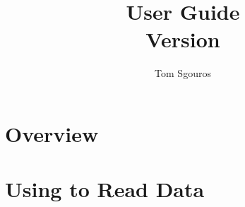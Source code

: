 \documentclass{dods-book}
\newcommand{\DOCversion}{Version \rcsInfoRevision}
\begin{document}
\title{\opendap User Guide\\\DOCversion}
\author{Tom Sgouros}
\date{\rcsInfoDate}
\maketitle

\copyrightmatter

\W{}



\tableofcontents
\listoffigures
\listoftables

\clearemptydoublepage


\part{Overview}




\part{Using \opendap to Read Data}








\end{document}
